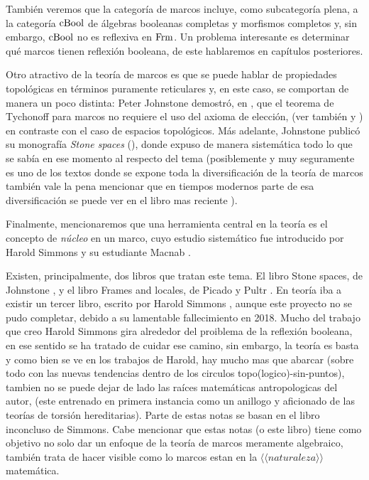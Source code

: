 También veremos que la categoría de marcos incluye,
como subcategoría plena, a la categoría $\mathrm{cBool}$ de álgebras booleanas
completas y morfismos completos y, sin embargo, $\mathrm{cBool}$ no es reflexiva
en $\mathrm{Frm}$.
Un problema interesante es determinar qué marcos tienen reflexión booleana, de este hablaremos en capítulos posteriores.


Otro atractivo de la teoría de marcos es que se puede hablar
de propiedades topológicas en términos puramente reticulares y,
en este caso, se comportan de manera un poco distinta:
Peter Johnstone demostró, en \cite{johnstone1981tychonoff}, que el teorema de Tychonoff
para marcos no requiere el uso del axioma de elección, (ver también \cite{banaschewski1988another} y \cite{kvrivz1985constructive})
en contraste con el caso de espacios topológicos.
Más adelante, Johnstone publicó su monografía \emph{Stone spaces} (\cite{johnstone1986stone}),
donde expuso de manera sistemática todo lo que se sabía en ese momento
al respecto del tema (posiblemente y muy seguramente es uno de los textos donde se expone 
toda la diversificación de la teoría de marcos también vale la pena mencionar que en tiempos modernos parte de esa diversificación se puede ver en el libro mas reciente \cite{picado2021separation}).

Finalmente, mencionaremos que una herramienta central
en la teoría es el concepto de \emph{núcleo} en un marco,
cuyo estudio sistemático fue introducido por Harold Simmons \cite{simmons1978framework}
y su estudiante Macnab \cite{macnab198110}.

Existen, principalmente, dos libros que tratan este tema.
El libro Stone spaces, de Johnstone \cite{johnstone1986stone},
y el libro Frames and locales, de Picado y Pultr \cite{PicadoPultr}.
En teoría iba a existir un tercer libro, escrito por Harold Simmons ,
aunque este proyecto no se pudo completar, debido a su
lamentable fallecimiento en 2018. Mucho del trabajo que creo Harold Simmons 
gira alrededor del proiblema de la reflexión booleana, 
en ese sentido se ha tratado de cuidar ese camino, sin embargo, 
la teoría es basta y como bien se ve en los trabajos de Harold, 
hay mucho mas que abarcar (sobre todo con las nuevas tendencias dentro de los circulos topo(logico)-sin-puntos), 
tambien no se puede dejar de lado las raíces matemáticas antropologicas del autor, 
(este entrenado en primera instancia como un anillogo y aficionado de las teorías de torsión hereditarias).
Parte de estas notas se basan en el libro inconcluso de Simmons. 
Cabe mencionar que estas notas (o este libro) tiene como objetivo no solo dar un enfoque de la teoría de marcos 
meramente algebraico, también trata de hacer visible como lo marcos 
estan en la $\langle \langle naturaleza \rangle \rangle$ matemática. 




